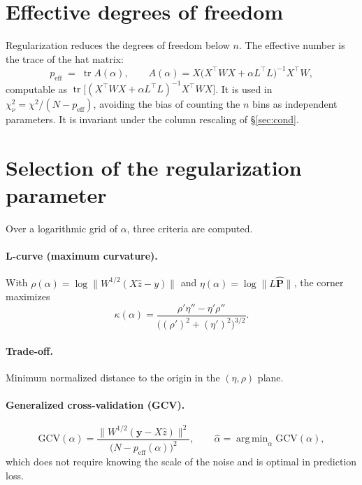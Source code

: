\documentclass[11pt,a4paper]{article}
\DeclareMathOperator{\tr}{tr}
\DeclareMathOperator*{\argmin}{arg\,min}
\begin{document}
\section{Effective degrees of freedom}\label{sec:effdof}

Regularization reduces the degrees of freedom below $n$. The effective
number is the trace of the hat matrix:
\begin{equation}
  p_{\text{eff}} \;=\; \tr A(\alpha),\qquad
  A(\alpha)=X\bigl(X^\top W X+\alpha L^\top L\bigr)^{-1}X^\top W,
  \label{eq:effdof}
\end{equation}
computable as $\tr\!\bigl[(X^\top WX+\alpha L^\top L)^{-1}X^\top WX\bigr]$. It is used
in $\chi^2_\nu=\chi^2/(N-p_{\text{eff}})$, avoiding the bias of counting the $n$
bins as independent parameters. It is invariant under the column rescaling
of \S\ref{sec:cond}.

\section{Selection of the regularization parameter}\label{sec:alpha}

Over a logarithmic grid of $\alpha$, three criteria are computed.

\paragraph{L-curve (maximum curvature).} With
$\rho(\alpha)=\log\lVert W^{1/2}(X\hat z-y)\rVert$ and
$\eta(\alpha)=\log\lVert L\hat{\bm P}\rVert$, the corner maximizes
\begin{equation}
  \kappa(\alpha)=\frac{\rho'\eta''-\eta'\rho''}{\bigl((\rho')^2+(\eta')^2\bigr)^{3/2}}.
\end{equation}

\paragraph{Trade-off.} Minimum normalized distance to the origin in the
$(\eta,\rho)$ plane.

\paragraph{Generalized cross-validation (GCV).}
\begin{equation}
  \mathrm{GCV}(\alpha)=\frac{\lVert W^{1/2}(\bm y - X\hat z)\rVert^2}{\bigl(N-p_{\text{eff}}(\alpha)\bigr)^2},
  \qquad \hat\alpha=\argmin_\alpha \mathrm{GCV}(\alpha),
\end{equation}
which does not require knowing the scale of the noise and is optimal in prediction loss.
\end{document}
